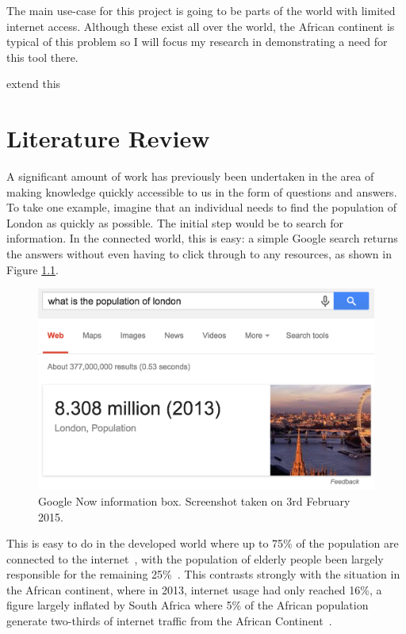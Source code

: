 \documentclass[authoryearcitations]{UoYCSproject}
\begin{document}
The main use-case for this project is going to be parts of the world with limited internet access.  Although these exist all over the world, the African continent is typical of this problem so I will focus my research in demonstrating a need for this tool there.

{\color{red} extend this}

\newpage

\chapter{Literature Review}
\label{sec:literatureReview}

A significant amount of work has previously been undertaken in the area of making knowledge quickly accessible to us in the form of questions and answers.  To take one example, imagine that an individual needs to find the population of London as quickly as possible.  The initial step would be to search for information.  In the connected world, this is easy: a simple Google search returns the answers without even having to click through to any resources, as shown in Figure \ref{fig:googleInstant}.

\begin{figure}[htb] 
\includegraphics[width=\linewidth]{googleInstant}
\caption{Google Now information box.  Screenshot taken on 3rd February 2015.}
\label{fig:googleInstant}
\end{figure}

This is easy to do in the developed world where up to 75\% of the population are connected to the internet~\cite{ITU_Cell_Usage_2013}, with the population of elderly people been largely responsible for the remaining 25\%~\cite{Gov_Internet_Usage_UK_2014}.  This contrasts strongly with the situation in the African continent, where in 2013, internet usage had only reached 16\%, a figure largely inflated by South Africa where 5\% of the African population generate two-thirds of internet traffic from the African Continent~\cite{ITU_Cell_Usage_2013}.
\end{document}
